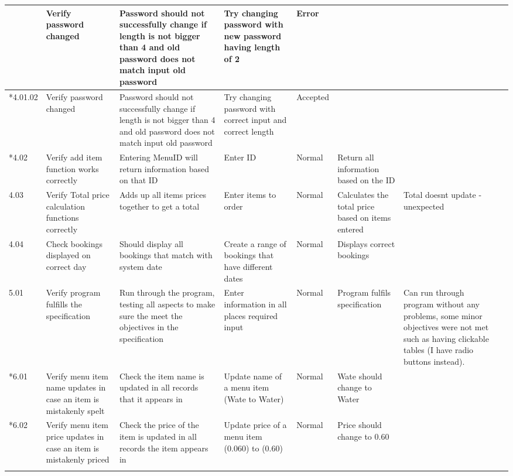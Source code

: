 \begin{landscape}
\begin{center}
\begin{longtable}{|p{1.5cm}|p{2.5cm}|p{2.5cm}|p{2cm}|p{2cm}|p{2cm}|p{2cm}|p{2cm}|}
{      \rowcolor{gray}   *4.01.01 & Verify password changed & Password should not successfully change if length is not bigger than 4 and old password does not match input old password   &Try changing password with new password having length of 2&Error& & \\ \hline
      \rowcolor{gray}   *4.01.02 & Verify password changed & Password should not successfully change if length is not bigger than 4 and old password does not match input old password   &  Try changing password with correct input and correct length&Accepted  & & \\ \hline
       \rowcolor{gray}  *4.02 & Verify add item function works correctly & Entering MenuID will return information based on that ID & Enter ID &  Normal & Return all information based on the ID  & & \\ \hline
        4.03 & Verify Total price calculation functions correctly & Adds up all items prices together to get a total & Enter items to order &  Normal & Calculates the total price based on items entered  & Total doesnt update - unexpected & \\ \hline
	4.04 & Check bookings displayed on correct day & Should display all bookings that match with system date & Create a range of bookings that have different dates & Normal& Displays correct bookings & & \\ \hline
         5.01 & Verify program fulfills the specification & Run through the program, testing all aspects to make sure the meet the objectives in the specification & Enter information in all places required input &  Normal & Program fulfils specification  & Can run through program without any problems, some minor objectives were not met such as having clickable tables (I have radio buttons instead). & \\ \hline
	 \rowcolor{gray}*6.01 & Verify menu item name updates in case an item is mistakenly spelt & Check  the item name is updated in all records that it appears in & Update name of a menu item (Wate to Water) & Normal & Wate should change to Water & & \\ \hline
	 \rowcolor{gray}*6.02 & Verify menu item price updates in case an item is mistakenly priced & Check the price of the item is updated in all records the item appears in & Update price of a menu item (0.060) to (0.60) & Normal & Price should change to 0.60 & & \\ \hline






}
\end{longtable}
\end{center}
\end{landscape}
